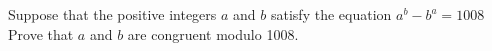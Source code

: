 Suppose that the positive integers $ a$ and $ b$ satisfy the equation $ a^b-b^a=1008$ Prove that $ a$ and $ b$ are congruent modulo 1008.